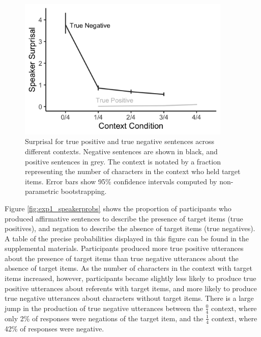 \documentclass[man, floatsintext, noapacite]{apa6}
\begin{document}
\begin{figure}[t]
\begin{center} 
\includegraphics[width=4in]{figures/experiment1/speaker_surprisal.png}
\caption{\label{fig:exp1_speakersurprise} Surprisal for true positive and true negative sentences across different contexts. Negative sentences are shown in black, and positive sentences in grey.  The context is notated by a fraction representing the number of characters in the context who held target items. Error bars show 95\% confidence intervals computed by non-parametric bootstrapping.  }
\end{center} 
\end{figure}

Figure \ref{fig:exp1_speakerprobs} shows the proportion of participants who produced affirmative sentences to describe the presence of target items (true positives), and negation to describe the absence of target items (true negatives). A table of the precise probabilities displayed in this figure can be found in the supplemental materials. Participants produced more true positive utterances about the presence of target items than true negative utterances about the absence of target items. As the number of characters in the context with target items increased, however, participants became slightly less likely to produce true positive utterances about referents with target items, and more likely to produce true negative utterances about characters without target items. There is a large jump in the production of true negative utterances between the $\frac{0}{4}$ context, where only 2\% of responses were negations of the target item, and the $\frac{1}{4}$ context, where 42\% of responses were negative. 
\end{document}
